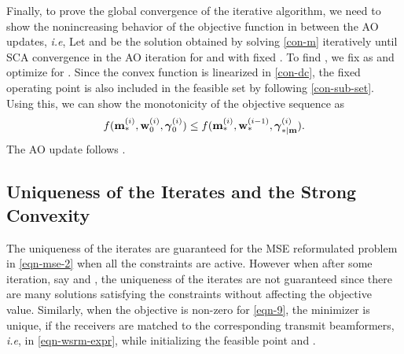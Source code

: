 Finally, to prove the global convergence of the iterative algorithm, we need to show the nonincreasing behavior of the objective function in between the \ac{AO} updates, \textit{i.e}, 
\iftoggle{single_column}{
\begin{equation}
f(\iter{\mx}{\ast}{i},\iter{\my}{0}{i},\iter{\mz}{0}{i}) \leq f(\iter{\mx}{\ast}{i},\iter{\my}{\ast}{i-1},\iter{\mz}{\ast|\my}{i}).
\end{equation}}{
\begin{equation}
f(\iter{\mx}{\ast}{i},\iter{\my}{0}{i},\iter{\mz}{0}{i}) \leq f(\iter{\mx}{\ast}{i},\iter{\my}{\ast}{i-1},\iter{\mz}{\ast|\my}{i}).
\end{equation}}
Let  and  be the solution obtained by solving \eqref{con-m} iteratively until \ac{SCA} convergence in the  \ac{AO} iteration for \eqn{\mx} and \eqn{\mz} with fixed . To find , we fix \eqn{\mx} as  and optimize for \me{\my}. Since the convex function is linearized in \eqref{con-dc}, the fixed operating point is also included in the feasible set  by following \eqref{con-sub-set}. Using this, we can show the monotonicity of the objective sequence as
\begin{equation} \label{fixed_point}
f(\iter{\mx}{\ast}{i},\iter{\my}{0}{i},\iter{\mz}{0}{i}) \leq f(\iter{\mx}{\ast}{i},\iter{\my}{\ast}{i-1},\iter{\mz}{\ast|\mx}{i}).
\end{equation}
The \ac{AO} update follows .

\subsection{Uniqueness of the Iterates and the Strong Convexity} \label{c-a}
The uniqueness of the iterates  are guaranteed for the \ac{MSE} reformulated problem in \eqref{eqn-mse-2} when all the constraints are active. However when  after some iteration, say  and , the uniqueness of the iterates are not guaranteed since there are many solutions satisfying the constraints without affecting the objective value. Similarly, when the objective is non-zero for  \eqref{eqn-9}, the minimizer is unique, if the receivers are matched to the corresponding transmit beamformers, \textit{i.e},  in \eqref{eqn-wsrm-expr}, while initializing the feasible point  and .

